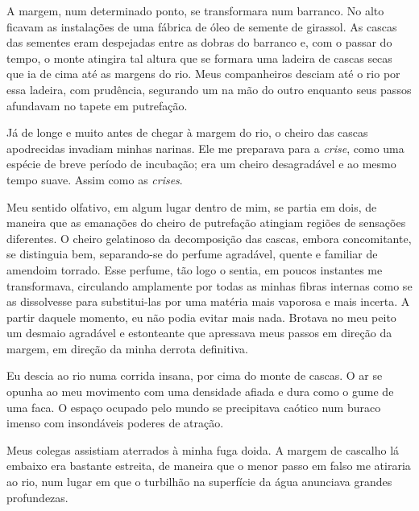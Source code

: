 A margem, num determinado ponto, se transformara num barranco. No alto ficavam as instalações de uma fábrica de óleo de semente de girassol. As cascas das sementes eram despejadas entre as dobras do barranco e, com o passar do tempo, o monte atingira tal altura que se formara uma ladeira de cascas secas que ia de cima até as margens do rio.
Meus companheiros desciam até o rio por essa ladeira, com prudência, segurando um na mão do outro enquanto seus passos afundavam no tapete em putrefação.


Já de longe e muito antes de chegar à margem do rio, o cheiro das cascas apodrecidas invadiam minhas narinas. Ele me preparava para a \textit{crise}, como uma espécie de breve período de incubação; era um cheiro desagradável e ao mesmo tempo suave. Assim como as \textit{crises}.

Meu sentido olfativo, em algum lugar dentro de mim, se partia em dois, de maneira que as emanações do cheiro de putrefação atingiam regiões de sensações diferentes. O cheiro gelatinoso da decomposição das cascas, embora concomitante, se distinguia bem, separando-se do perfume agradável, quente e familiar de amendoim torrado. 
Esse perfume, tão logo o sentia, em poucos instantes me transformava, circulando amplamente por todas as minhas fibras internas como se as dissolvesse para substitui-las por uma matéria mais vaporosa e mais incerta. A partir daquele momento, eu não podia evitar mais nada. Brotava no meu peito um desmaio agradável e estonteante que apressava meus passos em direção da margem, em direção da minha derrota definitiva.

Eu descia ao rio numa corrida insana, por cima do monte de cascas. O ar se opunha ao meu movimento com uma densidade afiada e dura como o gume de uma faca. O espaço ocupado pelo mundo se precipitava caótico num buraco imenso com insondáveis poderes de atração.

Meus colegas assistiam aterrados à minha fuga doida. A margem de cascalho lá embaixo era bastante estreita, de maneira que o menor passo em falso me atiraria ao rio, num lugar em que o turbilhão na superfície da água anunciava grandes profundezas.

